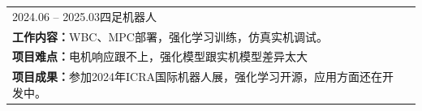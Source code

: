 \begin{tabular}{ll} 
	\qquad \faStopCircleO \textsc{2024.06 -- 2025.03}\quad \textsc{四足机器人}\\
	\qquad\qquad \textbf{工作内容：}WBC、MPC部署，强化学习训练，仿真实机调试。\\
	\qquad\qquad \textbf{项目难点：}电机响应跟不上，强化模型跟实机模型差异太大\\
	\qquad\qquad \textbf{项目成果：}参加2024年ICRA国际机器人展，强化学习开源，应用方面还在开发中。\\
	
\end{tabular}